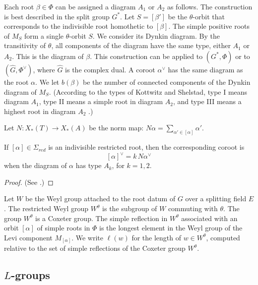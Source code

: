 Each root $\beta\in\Phi$ can be assigned a diagram $A_1$ or $A_2$ as
follows.  The construction is best described in the split group $G^*$.
Let $S=[\beta']$ be the $\theta$-orbit that corresponds to the
indivisible root homothetic to $[\beta]$.  The simple positive roots
of $M_S$ form a single $\theta$-orbit $S$.  We consider its Dynkin
diagram.  By the transitivity of $\theta$, all components of the
diagram have the same type, either $A_1$ or $A_2$.  This is the
diagram of $\beta$.  This construction can be applied to $(G^*,\Phi)$
or to $(\hat G,\Phi^\vee)$, where $\hat G$ is the complex dual.  A
coroot $\alpha^\vee$ has the same diagram as the root $\alpha$.  We let
$b(\beta)$ be the number of connected components of the Dynkin
diagram of $M_S$.  (According to the types of Kottwitz and Shelstad, type I
means diagram $A_1$, type II means a simple root in diagram $A_2$, and
type III means a highest root in diagram $A_2$
\cite{kottwitz1999foundations}.)

Let $N:X_*(T)\to X_*(A)$ be the norm map: 
$N\alpha = \sum_{\alpha'\in  [\alpha]} \alpha'$.

\begin{lemma}\label{lemma:norm}
 If $[\alpha]\in\Sigma_{red}$ is an indivisible restricted root, then
  the corresponding coroot is
\begin{equation}\label{eqn:norm}
[\alpha]^\vee = k\, N\alpha^\vee
\end{equation}
when the diagram of $\alpha$ has type $A_k$, for $k=1,2$.
\end{lemma}

\begin{proof}
(See \cite[1.3.9]{kottwitz1999foundations}.)
\end{proof}

Let $W$ be the Weyl group attached to the root datum of $G$ over a
splitting field $E$.  The restricted Weyl group $W^\theta$ is the
subgroup of $W$ commuting with $\theta$.  The group $W^\theta$ is a
Coxeter group.  The simple reflection in $W^\theta$ associated with an
orbit $[\alpha]$ of simple roots in $\Phi$ is the longest element in
the Weyl group of the Levi component $M_{[\alpha]}$.  We write
$\ell(w)$ for the length of $w\in W^\theta$, computed relative to the
set of simple reflections of the Coxeter group $W^\theta$.

\subsection{$L$-groups}\label{sec:L}

